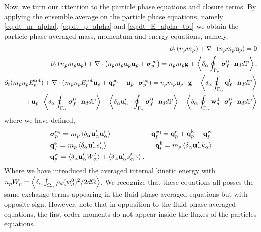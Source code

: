 Now, we turn our attention to the particle phase equations and closure terms. 
By applying the ensemble average on the particle phase equations, namely \ref{eq:dt_m_alpha}, \ref{eq:dt_p_alpha} and \ref{eq:dt_E_alpha_tot} we obtain the particle-phase averaged mass, momentum and energy equations, namely, 
\begin{align}
    \label{eq:dt_hybrid_mp}
    \partial_t \left(n_p m_p\right)
    + \mathbf{\nabla}\cdot \left(n_pm_p\textbf{u}_p
    \right)
    = 
    0\\
    \label{eq:dt_hybrid_up}
    \partial_t \left(n_p m_p \textbf{u}_p\right)
    + \mathbf{\nabla}\cdot \left(n_p
    m_p \textbf{u}_p \textbf{u}_p 
    + \bm{\sigma}_p^\text{eq}
    \right)
    = 
    n_p m_p \textbf{g}
    + \left<\delta_\alpha \oint_{\Gamma_{\alpha}} {\bm{\sigma}_f^0 \cdot \textbf{n}_d} d\Gamma\right>,\\
    \label{eq:dt_hybrid_Ep}
    \partial_t(m_p n_pE_p^\text{tot})
    + \mathbf{\nabla}\cdot(m_pn_p E_p^\text{tot} \textbf{u}_p 
    + \textbf{q}_p^\text{eq} 
    + \textbf{u}_p \cdot \bm{\sigma}_p^\text{eq})
    =  n_p m_p \textbf{u}_p\cdot  \textbf{g}
    -  \left<\delta_\alpha \oint_{\Gamma_{\alpha}} \textbf{q}_f^0 \cdot \textbf{n}_d d\Gamma\right>\nonumber\\
    + \textbf{u}_p \cdot\left<\delta_\alpha \oint_{\Gamma_{\alpha}} {\bm{\sigma}_f^0 \cdot \textbf{n}_d} d\Gamma\right>
    + \left<\delta_\alpha \textbf{u}_\alpha' \cdot\oint_{\Gamma_{\alpha}} \bm{\sigma}_f^0 \cdot \textbf{n}_d d\Gamma\right>
    + \left<\delta_\alpha \oint_{\Gamma_{\alpha}} {\textbf{w}_d^0 \cdot\bm{\sigma}_f^0 \cdot \textbf{n}_d} d\Gamma\right>
\end{align}
where we have defined, 
\begin{align*}
    &\bm{\sigma}_p^\text{eq}
    =  m_p\left<\delta_\alpha \textbf{u}_\alpha'\textbf{u}_\alpha'\right>
    &\textbf{q}_p^\text{eq}
    =\textbf{q}_p^\text{e} 
    +\textbf{q}_p^\text{k}  
    +\textbf{q}_p^\text{w}  
    \\
    &\textbf{q}_f^\text{e}
    = m_p \left<\delta_\alpha \textbf{u}_\alpha' e_\alpha'\right> 
    &\textbf{q}_p^\text{k}
    = m_p \left<\delta_\alpha \textbf{u}_\alpha' k_\alpha\right> 
    \\
    &\textbf{q}_p^\text{w}
    = 
     \left<\delta_\alpha \textbf{u}_\alpha'W_\alpha'\right>
    + \left<\delta_\alpha \textbf{u}_\alpha' s_\alpha' \gamma\right>.
\end{align*}
Where we have introduced the averaged internal kinetic energy with $n_pW_p = \left<\delta_\alpha \int_{\Omega_{\alpha}} {\rho_d  (w_d^0)^2/2} d\Omega\right>$. 
We recognize that these equations all posses the same exchange terms appearing in the fluid phase averaged equations but with opposite sign. 
However, note that in opposition to the fluid phase averaged equations, the first order moments do not appear inside the fluxes of the particles equations. 
